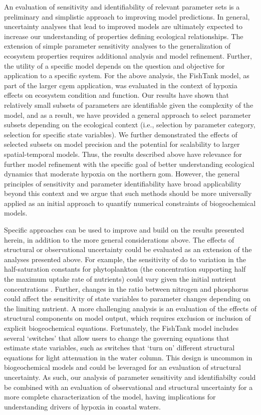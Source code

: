\documentclass[preprint]{elsarticle}\usepackage[]{graphicx}\usepackage[]{color}
\begin{document}
An evaluation of sensitivity and identifiability of relevant parameter sets is a preliminary and simplistic approach to improving model predictions.  In general, uncertainty analyses that lead to improved models are ultimately expected to increase our understanding of properties defining ecological relationships.  The extension of simple parameter sensitivity analyses to the generalization of ecosystem properties requires additional analysis and model refinement. Further, the utility of a specific model depends on the question and objective for application to a specific system.  For the above analysis, the FishTank model, as part of the larger \ac{cgem} application, was evaluated in the context of hypoxia effects on ecosystem condition and function.  Our results have shown that relatively small subsets of parameters are identifiable given the complexity of the model, and as a result, we have provided a general approach to select parameter subsets depending on the ecological context (i.e., selection by parameter category, selection for specific state variables). We further demonstrated the effects of selected subsets on model precision and the potential for scalability to larger spatial-temporal models. Thus, the results described above have relevance for further model refinement with the specific goal of better understanding ecological dynamics that moderate hypoxia on the northern \ac{gom}.  However, the general principles of sensitivity and parameter identifiability have broad applicability beyond this context and we argue that such methods should be more universally applied as an initial approach to quantify numerical constraints of biogeochemical models.  

Specific approaches can be used to improve and build on the results presented herein, in addition to the more general considerations above.  The effects of structural or observational uncertainty could be evaluated as an extension of the analyses presented above. For example, the sensitivity of \ac{do} to variation in the half-saturation constants for phytoplankton (the concentration supporting half the maximum uptake rate of nutrients) could vary given the initial nutrient concentrations \citep{Eppley69}. Further, changes in the ratio between nitrogen and phosphorus could affect the sensitivity of state variables to parameter changes depending on the limiting nutrient.  A more challenging analysis is an evaluation of the effects of structural components on model output, which requires exclusion or inclusion of explicit biogeochemical equations. Fortunately, the FishTank model includes several `switches' that allow users to change the governing equations that estimate state variables, such as switches that `turn on' different structural equations for light attenuation in the water column.  This design is uncommon in biogeochemical models and could be leveraged for an evaluation of structural uncertainty. As such, our analysis of parameter sensitivity and identifiabilty could be combined with an evaluation of observational and structural uncertainty for a more complete characterization of the model, having implications for understanding drivers of hypoxia in coastal waters.  
\end{document}
